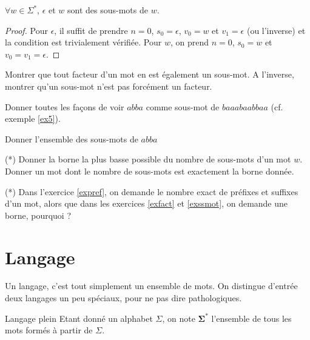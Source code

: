 \begin{lemma}
$\forall w \in \Sigma^*$, $\epsilon$ et $w$ sont des sous-mots de $w$.
\end{lemma}

\begin{proof}
Pour $\epsilon$, il suffit de prendre $n = 0$, $s_0 = \epsilon$, $v_0 = w$ et $v_1 = \epsilon$ (ou l'inverse) et la condition est trivialement vérifiée. Pour $w$, on prend $n = 0$, $s_0 = w$ et $v_0 = v_1 = \epsilon$.
\end{proof}

\begin{exercice}
Montrer que tout facteur d'un mot en est également un sous-mot. A l'inverse, montrer qu'un sous-mot n'est pas forcément un facteur. 
\end{exercice}

\begin{exercice}
Donner toutes les façons de voir $abba$ comme sous-mot de $baaabaabbaa$ (cf. exemple \ref{ex5}).
\end{exercice}

\begin{exercice}
Donner l'ensemble des sous-mots de $abba$
\end{exercice}

\begin{exercice}\label{exssmot} (*)
Donner la borne la plus basse possible du nombre de sous-mots d'un mot $w$. Donner un mot dont le nombre de sous-mots est exactement la borne donnée.
\end{exercice}

\begin{exercice} (*) Dans l'exercice \ref{expref}, on demande le nombre exact de préfixes et suffixes d'un mot, alors que dans les exercices \ref{exfact} et \ref{exssmot}, on demande une borne, pourquoi ?
\end{exercice}

\section{Langage}


Un langage, c'est tout simplement un ensemble de mots. On distingue d'entrée deux langages un peu spéciaux, pour ne pas dire pathologiques.

\begin{definition}{Langage plein}{}
Etant donné un alphabet $\Sigma$, on note $\mathbf{\Sigma^*}$ l'ensemble de tous les mots formés à partir de $\Sigma$.
\end{definition}


